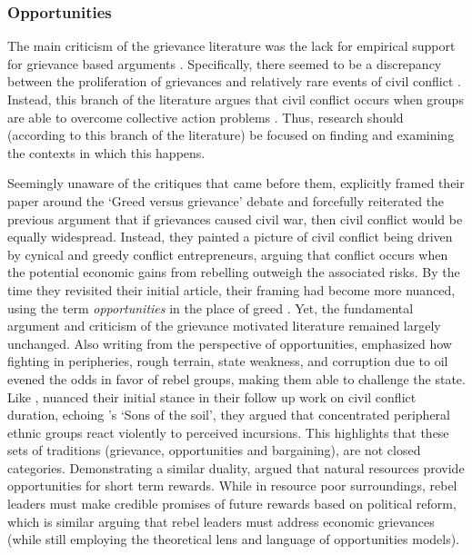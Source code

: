 
\subsubsection{Opportunities} \label{Opportunities}

The main criticism of the grievance literature was the lack for empirical
support for grievance based arguments \citep{Oberschall_1978, Brush_1996}.
Specifically, there seemed to be a discrepancy between the proliferation of
grievances and relatively rare events of civil conflict \citep{Snyder_1972,
TillyCharles1978Fmtr, Skocpol_1979}. Instead, this branch of the literature
argues that civil conflict occurs when groups are able to overcome collective
action problems \citep{Larson_2018}. Thus, research should (according to this
branch of the literature) be focused on finding and examining the contexts in
which this happens.

Seemingly unaware of the critiques that came before them, \citet{Collier2004}
explicitly framed their paper around the `Greed versus grievance' debate and
forcefully reiterated the previous argument that if grievances caused civil war,
then civil conflict would be equally widespread. Instead, they painted a picture
of civil conflict being driven by cynical and greedy conflict entrepreneurs,
arguing that conflict occurs when the potential economic gains from rebelling
outweigh the associated risks. By the time they revisited their
initial article, their framing had become more nuanced, using the term
\textit{opportunities} in the place of greed \citep{Collier2009}. Yet, the
fundamental argument and criticism of the grievance motivated literature
remained largely unchanged. Also writing from the perspective of opportunities,
\citet{Fearon2003} emphasized how fighting in peripheries, rough terrain, state
weakness, and corruption due to oil evened the odds in favor of rebel groups,
making them able to challenge the state. Like \citet{Collier2009},
\citet{Fearon_2004} nuanced their initial stance in their follow up work on
civil conflict duration, echoing \citet{WeinerMyron1978SotS}'s `Sons of the soil',
they argued that concentrated peripheral ethnic groups react violently to
perceived incursions. This highlights that these sets of traditions (grievance,
opportunities and bargaining), are not closed categories. Demonstrating a
similar duality, \citet{Weinstein_2005} argued that natural resources provide
opportunities for short term rewards. While in resource poor surroundings, rebel
leaders must make credible promises of future rewards based on political reform,
which is similar arguing that rebel leaders must address economic grievances
(while still employing the theoretical lens and language of opportunities
models).

